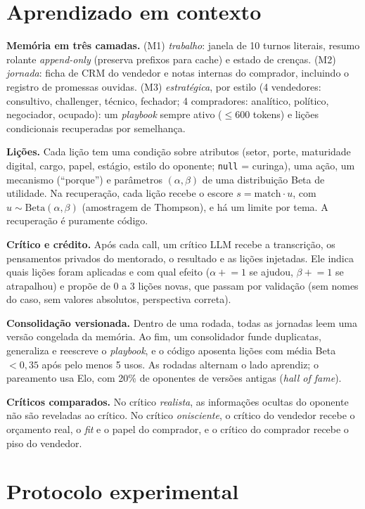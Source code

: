 \documentclass[11pt,a4paper]{article}
\begin{document}
\section{Aprendizado em contexto}

\textbf{Memória em três camadas.} (M1) \emph{trabalho}: janela de 10 turnos literais, resumo rolante \emph{append-only} (preserva prefixos para cache) e estado de crenças. (M2) \emph{jornada}: ficha de CRM do vendedor e notas internas do comprador, incluindo o registro de promessas ouvidas. (M3) \emph{estratégica}, por estilo (4 vendedores: consultivo, challenger, técnico, fechador; 4 compradores: analítico, político, negociador, ocupado): um \emph{playbook} sempre ativo ($\le$600 tokens) e lições condicionais recuperadas por semelhança.

\textbf{Lições.} Cada lição tem uma condição sobre atributos (setor, porte, maturidade digital, cargo, papel, estágio, estilo do oponente; \texttt{null} = curinga), uma ação, um mecanismo (``porque'') e parâmetros $(\alpha,\beta)$ de uma distribuição Beta de utilidade. Na recuperação, cada lição recebe o escore $s=\text{match}\cdot u$, com $u\sim\text{Beta}(\alpha,\beta)$ (amostragem de Thompson), e há um limite por tema. A recuperação é puramente código.

\textbf{Crítico e crédito.} Após cada call, um crítico LLM recebe a transcrição, os pensamentos privados do mentorado, o resultado e as lições injetadas. Ele indica quais lições foram aplicadas e com qual efeito ($\alpha\mathrel{+}=1$ se ajudou, $\beta\mathrel{+}=1$ se atrapalhou) e propõe de 0 a 3 lições novas, que passam por validação (sem nomes do caso, sem valores absolutos, perspectiva correta).

\textbf{Consolidação versionada.} Dentro de uma rodada, todas as jornadas leem uma versão congelada da memória. Ao fim, um consolidador funde duplicatas, generaliza e reescreve o \emph{playbook}, e o código aposenta lições com média Beta $<0{,}35$ após pelo menos 5 usos. As rodadas alternam o lado aprendiz; o pareamento usa Elo, com 20\% de oponentes de versões antigas (\emph{hall of fame}).

\textbf{Críticos comparados.} No crítico \emph{realista}, as informações ocultas do oponente não são reveladas ao crítico. No crítico \emph{onisciente}, o crítico do vendedor recebe o orçamento real, o \emph{fit} e o papel do comprador, e o crítico do comprador recebe o piso do vendedor.

\section{Protocolo experimental}
\end{document}
